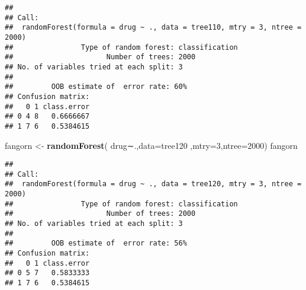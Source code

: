 \documentclass[]{article}
\newenvironment{Shaded}{\begin{snugshade}}{\end{snugshade}}
\newcommand{\KeywordTok}[1]{\textcolor[rgb]{0.13,0.29,0.53}{\textbf{#1}}}
\newcommand{\DataTypeTok}[1]{\textcolor[rgb]{0.13,0.29,0.53}{#1}}
\newcommand{\DecValTok}[1]{\textcolor[rgb]{0.00,0.00,0.81}{#1}}
\newcommand{\StringTok}[1]{\textcolor[rgb]{0.31,0.60,0.02}{#1}}
\newcommand{\NormalTok}[1]{#1}
\begin{document}
\begin{verbatim}
## 
## Call:
##  randomForest(formula = drug ~ ., data = tree110, mtry = 3, ntree = 2000) 
##                Type of random forest: classification
##                      Number of trees: 2000
## No. of variables tried at each split: 3
## 
##         OOB estimate of  error rate: 60%
## Confusion matrix:
##   0 1 class.error
## 0 4 8   0.6666667
## 1 7 6   0.5384615
\end{verbatim}

\begin{Shaded}
\begin{Highlighting}[]
\NormalTok{fangorn <-}\StringTok{ }\KeywordTok{randomForest}\NormalTok{( drug∼.,}\DataTypeTok{data=}\NormalTok{tree120  ,}\DataTypeTok{mtry=}\DecValTok{3}\NormalTok{,}\DataTypeTok{ntree=}\DecValTok{2000}\NormalTok{)}
\NormalTok{fangorn}
\end{Highlighting}
\end{Shaded}

\begin{verbatim}
## 
## Call:
##  randomForest(formula = drug ~ ., data = tree120, mtry = 3, ntree = 2000) 
##                Type of random forest: classification
##                      Number of trees: 2000
## No. of variables tried at each split: 3
## 
##         OOB estimate of  error rate: 56%
## Confusion matrix:
##   0 1 class.error
## 0 5 7   0.5833333
## 1 7 6   0.5384615
\end{verbatim}
\end{document}
